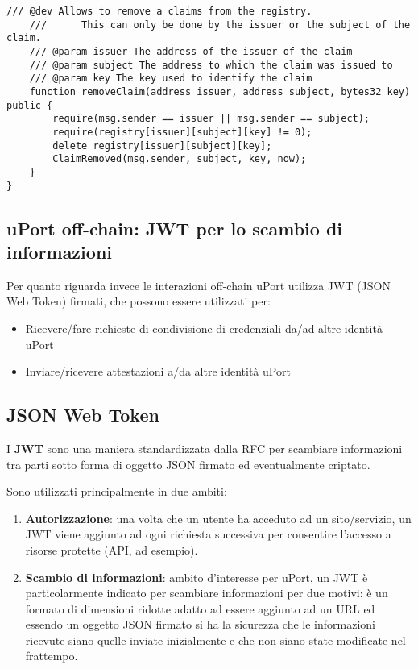 \begin{itemize}
\begin{lstlisting}[language=Solidity]
    /// @dev Allows to remove a claims from the registry.
    ///      This can only be done by the issuer or the subject of the claim.
    /// @param issuer The address of the issuer of the claim
    /// @param subject The address to which the claim was issued to
    /// @param key The key used to identify the claim
    function removeClaim(address issuer, address subject, bytes32 key) public {
        require(msg.sender == issuer || msg.sender == subject);
        require(registry[issuer][subject][key] != 0);
        delete registry[issuer][subject][key];
        ClaimRemoved(msg.sender, subject, key, now);
    }
}
  \end{lstlisting}
\end{itemize}

\subsection{uPort off-chain: JWT per lo scambio di informazioni}

Per quanto riguarda invece le interazioni off-chain uPort utilizza JWT (JSON Web Token)
firmati, che possono essere utilizzati per:
\begin{itemize}
  \item Ricevere/fare richieste di condivisione di credenziali da/ad altre identità uPort
  \item Inviare/ricevere attestazioni a/da altre identità uPort
\end{itemize}

\subsection{JSON Web Token}

I \textbf{JWT} sono una maniera standardizzata dalla RFC per scambiare informazioni
tra parti sotto forma di oggetto JSON firmato ed eventualmente criptato.

Sono utilizzati principalmente in due ambiti:
\begin{enumerate}
  \item \textbf{Autorizzazione}: una volta che un utente ha acceduto ad un sito/servizio,
  un JWT viene aggiunto ad ogni richiesta successiva per consentire
  l’accesso a risorse protette (API, ad esempio).
  \item \textbf{Scambio di informazioni}: ambito d’interesse per uPort,
  un JWT è particolarmente indicato per scambiare informazioni per due motivi:
  è un formato di dimensioni ridotte adatto ad essere aggiunto ad un URL
  ed essendo un oggetto JSON firmato si ha la sicurezza che le informazioni ricevute
  siano quelle inviate inizialmente e che non siano state modificate nel frattempo.
\end{enumerate}


